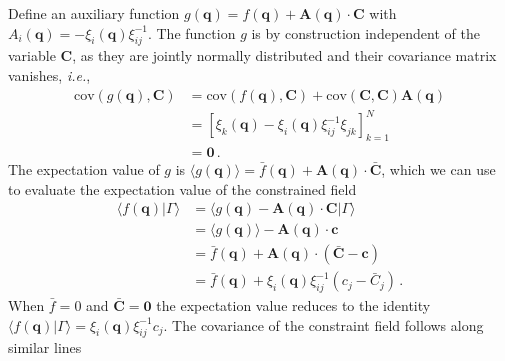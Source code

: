 \documentclass[a4paper, 11pt]{article}
\begin{document}
Define an auxiliary function $g(\bm{q}) = f(\bm{q}) + \bm{A}(\bm{q}) \cdot \bm{C}$ with $A_i(\bm{q}) = -\xi_i(\bm{q}) \xi_{ij}^{-1}$. The function $g$ is by construction independent of the variable $\bm{C}$, as they are jointly normally distributed and their covariance matrix vanishes, \textit{i.e.}, 
\begin{align}
\text{cov}(g(\bm{q}),\bm{C})
&=\text{cov}(f(\bm{q}),\bm{C}) +  \text{cov}(\bm{C},\bm{C}) \bm{A}(\bm{q}) \\
&=[\xi_k(\bm{q}) - \xi_i(\bm{q}) \xi_{ij}^{-1}\xi_{jk}]_{k=1}^N\\
&=\bm{0}\,.
\end{align}
The expectation value of $g$ is $\langle g(\bm{q})\rangle = \bar{f}(\bm{q}) + \bm{A}(\bm{q}) \cdot \bar{\bm{C}}$, which we can use to evaluate the expectation value of the constrained field
\begin{align}
\langle f(\bm{q}) | \Gamma \rangle 
&=\langle g(\bm{q}) - \bm{A}(\bm{q})\cdot \bm{C}|\Gamma\rangle\\
&=\langle g(\bm{q})\rangle - \bm{A}(\bm{q}) \cdot \bm{c}\\
&=\bar{f}(\bm{q}) + \bm{A}(\bm{q})\cdot (\bar{\bm{C}}-\bm{c})\\
&= \bar{f}(\bm{q}) + \xi_i(\bm{q})\xi_{ij}^{-1}(c_j -\bar{C}_j)\,.
\end{align}
When $\bar{f} = 0$ and $\bar{\bm{C}}=\bm{0}$ the expectation value reduces to the identity $\langle f(\bm{q}) | \Gamma \rangle =\xi_i(\bm{q})\xi_{ij}^{-1}c_j$. The covariance of the constraint field follows along similar lines
\end{document}
